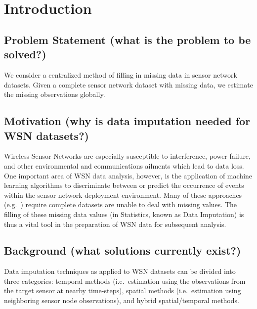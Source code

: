 \section{Introduction}

\subsection{Problem Statement (what is the problem to be solved?)}
We consider a centralized method of filling in missing data in sensor network datasets.
Given a complete sensor network dataset with missing data, we estimate the missing observations globally.


\subsection{Motivation (why is data imputation needed for WSN datasets?)}
Wireless Sensor Networks are especially susceptible to interference, power failure, and other environmental and communications ailments which lead to data loss.
One important area of WSN data analysis, however, is the application of machine learning algorithms to discriminate between or predict the occurrence of events within the sensor network deployment environment.
Many of these approaches (e.g.\ ) require complete datasets are unable to deal with missing values. The filling of these missing data values (in Statistics, known as Data Imputation) is thus a vital tool in the preparation of WSN data for subsequent analysis. 

\subsection{Background (what solutions currently exist?)}
Data imputation techniques as applied to WSN datasets can be divided into three categories:
temporal methods (i.e.\ estimation using the observations from the target sensor at nearby time-steps),
spatial methods (i.e.\ estimation using neighboring sensor node observations),
and hybrid spatial/temporal methods.


